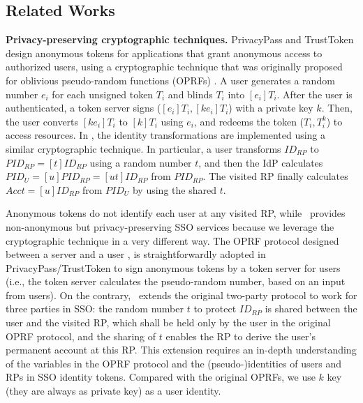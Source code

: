\subsection{Related Works}
\label{sec:related}

%

\newc
\noindent\textbf{Privacy-preserving cryptographic techniques.}
PrivacyPass and TrustToken \cite{privacypass,trusttoken} design anonymous tokens for applications that grant anonymous access to authorized users, using a cryptographic technique that was originally proposed for oblivious pseudo-random functions (OPRFs) \cite{oprf-proved,voprf-proved,oprf-bitcoin-wallet}.
A user generates a random number $e_i$ for each unsigned token $T_i$ and blinds $T_i$ into $[e_i]T_i$.
After the user is authenticated, a token server signs ($[e_i]T_i, [k e_i]T_i$) with a private key $k$. Then, the user converts $[ke_i]T_i$ to $[k]T_i$ using $e_i$, and redeems the token ($T_i, T_i^k$) to access resources.
In \usso, the identity transformations are implemented using a similar cryptographic technique.
In particular, a user transforms $ID_{RP}$ to $PID_{RP} = [t]ID_{RP}$ using a random number $t$,
 and then the IdP calculates $PID_U = [u]PID_{RP} = [ut]ID_{RP}$ from $PID_{RP}$.
 The visited RP finally calculates $Acct = [u]ID_{RP}$ from $PID_{U}$ by using the shared $t$.

Anonymous tokens \cite{privacypass,trusttoken} do not identify each user at any visited RP,
    while \usso\ provides non-anonymous but privacy-preserving SSO services because we leverage the cryptographic technique in a very different way.
The OPRF protocol designed between a server and a user \cite{oprf-proved,voprf-proved,oprf-bitcoin-wallet},
    is straightforwardly adopted in PrivacyPass/TrustToken to sign anonymous tokens by a token server for users
        (i.e., the token server calculates the pseudo-random number, based on an input from users).
On the contrary, \usso\ extends the original two-party protocol to work for three parties in SSO:
        the random number $t$ to protect $ID_{RP}$ is shared between the user and the visited RP,
            which shall be held only by the user in the original OPRF protocol,
                and the sharing of $t$ enables the RP to derive the user's permanent account at this RP.
This extension requires an in-depth understanding of the variables in the OPRF protocol and the (pseudo-)identities of users and RPs in SSO identity tokens.
Compared with the original OPRFs, we use $k$ key (they are always as private key) as a user identity.

